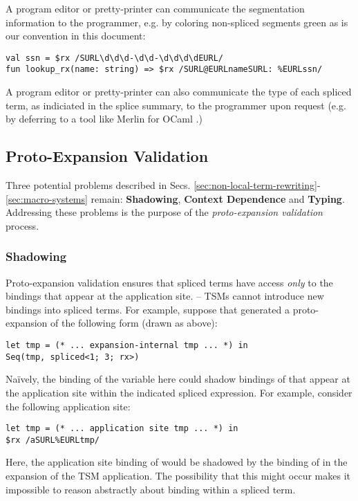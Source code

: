 A program editor or pretty-printer can communicate the segmentation information to the programmer, e.g. by coloring non-spliced segments green as is our convention in this document:
\begin{lstlisting}[numbers=none]
val ssn = $rx /SURL\d\d\d-\d\d-\d\d\d\dEURL/
fun lookup_rx(name: string) => $rx /SURL@EURLnameSURL: %EURLssn/ 
\end{lstlisting}

A program editor or pretty-printer can also communicate the type of each spliced term, as indiciated in the splice summary, to the programmer upon request (e.g. by deferring to a tool like Merlin for OCaml \cite{Merlin}.)

\subsection{Proto-Expansion Validation}\label{sec:uetsms-validation}
Three potential problems described in Secs. \ref{sec:non-local-term-rewriting}-\ref{sec:macro-systems} remain: \textbf{Shadowing}, \textbf{Context Dependence} and \textbf{Typing}. Addressing these problems is the purpose of the \emph{proto-expansion validation} process.


\subsubsection{Shadowing}
Proto-expansion validation ensures that spliced terms have access \emph{only} to the bindings that appear at the application site. -- TSMs cannot introduce new bindings into spliced terms. For example, suppose that   generated a proto-expansion of the following  form (drawn as above):
\begin{lstlisting}[numbers=none]
let tmp = (* ... expansion-internal tmp ... *) in 
Seq(tmp, spliced<1; 3; rx>)
\end{lstlisting}
Na\"ively, the binding of the variable  here could shadow bindings of  that appear at the application site within the indicated spliced expression. For example, consider the following application site:
\begin{lstlisting}[numbers=none]
let tmp = (* ... application site tmp ... *) in 
$rx /aSURL%EURLtmp/
\end{lstlisting}
Here, the application site binding of  would be shadowed by the binding of  in the expansion of the TSM application. The possibility that this might occur makes it impossible to reason abstractly about binding within a spliced term. 

